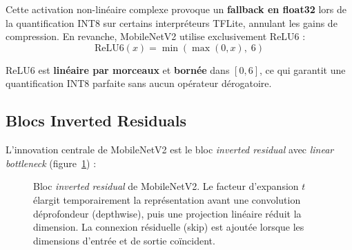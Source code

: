 \documentclass[12pt, a4paper, twoside]{report}
\begin{document}
Cette activation non-linéaire complexe provoque un \textbf{fallback en float32} lors de la quantification INT8 sur certains interpréteurs TFLite, annulant les gains de compression. En revanche, MobileNetV2 utilise exclusivement ReLU6 :
\begin{equation}
\text{ReLU6}(x) = \min(\max(0, x),\; 6)
\end{equation}

ReLU6 est \textbf{linéaire par morceaux} et \textbf{bornée} dans $[0, 6]$, ce qui garantit une quantification INT8 parfaite sans aucun opérateur dérogatoire.

\subsection{Blocs Inverted Residuals}

L'innovation centrale de MobileNetV2 est le bloc \textit{inverted residual} avec \textit{linear bottleneck} (figure~\ref{fig:inverted-residual}) :

\begin{figure}[H]
\centering
{}
\caption{Bloc \textit{inverted residual} de MobileNetV2. Le facteur d'expansion $t$ élargit temporairement la représentation avant une convolution déprofondeur (depthwise), puis une projection linéaire réduit la dimension. La connexion résiduelle (skip) est ajoutée lorsque les dimensions d'entrée et de sortie coïncident.}
\label{fig:inverted-residual}
\end{figure}
\end{document}
